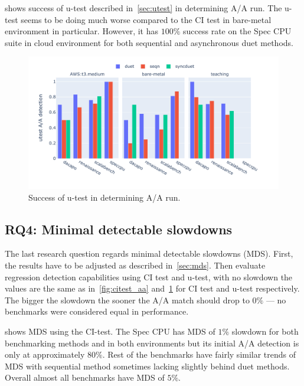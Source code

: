  shows success of \mbox{u-test} described in~\cref{sec:utest} in determining A/A run.
The \mbox{u-test} seems to be doing much worse compared to the CI test in bare-metal environment in particular.
However, it has $100\%$ success rate on the Spec CPU suite in cloud environment for both sequential and asynchronous duet methods.

\begin{figure}
	\centering
	\includegraphics[width=1\linewidth]{./figures/utest_aa_match.pdf}
	\caption{
		Success of \mbox{u-test} in determining A/A run.
	}
	\label{fig:utest_aa}
\end{figure}

\subsection{RQ4: Minimal detectable slowdowns}
\label{sec:rq4}

The last research question regards minimal detectable slowdowns (MDS).
First, the results have to be adjusted as described in~\cref{sec:mds}.
Then evaluate regression detection capabilities using CI test and \mbox{u-test}, with no slowdown the values are the same as in~\cref{fig:citest_aa} and~\cref{fig:utest_aa} for CI test and \mbox{u-test} respectively.
The bigger the slowdown the sooner the A/A match should drop to $0\%$ --- no benchmarks were considered equal in performance.

 shows MDS using the CI-test.
The Spec CPU has MDS of $1\%$ slowdown for both benchmarking methods and in both environments but its initial A/A detection is only at approximately $80\%$.
Rest of the benchmarks have fairly similar trends of MDS with sequential method sometimes lacking slightly behind duet methods.
Overall almost all benchmarks have MDS of $5\%$.

